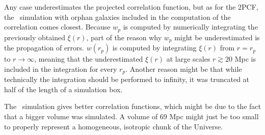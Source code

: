 Any case underestimates the projected correlation function, but as for the 2PCF, the \glarge\ simulation with orphan galaxies included in the computation of the correlation comes closest.
Because $w_p$ is computed by numerically integrating the previously obtained $\xi(r)$, part of the reason why $w_p$ might be underestimated is the propagation of errors.
$w(r_p)$ is computed by integrating $\xi(r)$ from $r=r_p$ to $r\rightarrow \infty$, meaning that the underestimated $\xi(r)$ at large scales $r\gtrsim 20$ Mpc is included in the integration for every $r_p$.
Another reason might be that while technically the integration should be performed to infinity, it was truncated at half of the length of a simulation box.


The \glarge\ simulation gives better correlation functions, which might be due to the fact that a bigger volume was simulated.
A volume of 69 Mpc might just be too small to properly represent a homogeneous, isotropic chunk of the Universe.
















%
